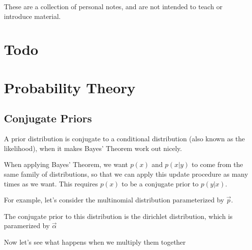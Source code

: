 \documentclass[12pt]{article}
\begin{document}
\maketitle

These are a collection of personal notes, and are not intended to teach or introduce material.

\tableofcontents

\newpage

\section{Todo}

  
\section{Probability Theory}

\subsection{Conjugate Priors}

A prior distribution is conjugate to a conditional distribution (also known as the likelihood), when it makes Bayes' Theorem work out nicely.


When applying Bayes' Theorem, we want $p(x)$ and $p(x|y)$ to come from the same family of distributions, so that we can apply this update procedure as many times as we want. This requires $p(x)$ to be a conjugate prior to $p(y|x)$.

For example, let's consider the multinomial distribution parameterized by $\vec p$.


The conjugate prior to this distribution is the dirichlet distribution, which is paramerized by $\vec \alpha$


Now let's see what happens when we multiply them together

\end{document}
